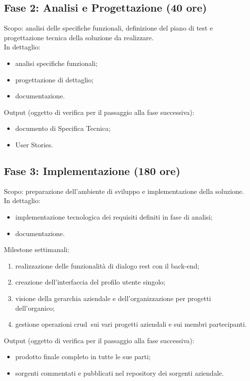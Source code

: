 \subsection{Fase 2: Analisi e Progettazione (40 ore)}
Scopo: analisi delle specifiche funzionali, definizione del piano di test e progettazione tecnica
della soluzione da realizzare.\\
In dettaglio:
\begin{itemize}
	\item analisi specifiche funzionali;
	\item progettazione di dettaglio;
	\item documentazione.
\end{itemize}
Output (oggetto di verifica per il passaggio alla fase successiva):
\begin{itemize}
	\item documento di Specifica Tecnica;
	\item User Stories.
\end{itemize}

\subsection{Fase 3: Implementazione (180 ore)}
Scopo: preparazione dell’ambiente di sviluppo e implementazione della soluzione.\\
In dettaglio:
\begin{itemize}
	\item implementazione tecnologica dei requisiti definiti in fase di analisi;
	\item documentazione.
\end{itemize}
Milestone settimanali:
\begin{enumerate}
	\item realizzazione delle funzionalità di dialogo \gls{rest} con il \gls{back-end};
	\item creazione dell'interfaccia del profilo utente singolo;
	\item visione della gerarchia aziendale e dell'organizzazione per progetti dell'organico;
	\item gestione operazioni \gls{crud}\glsfirstoccur\  sui vari progetti aziendali e sui membri partecipanti.
\end{enumerate}
Output (oggetto di verifica per il passaggio alla fase successiva):
\begin{itemize}
	\item prodotto finale completo in tutte le sue parti;
	\item sorgenti commentati e pubblicati nel repository dei sorgenti aziendale.
\end{itemize}

